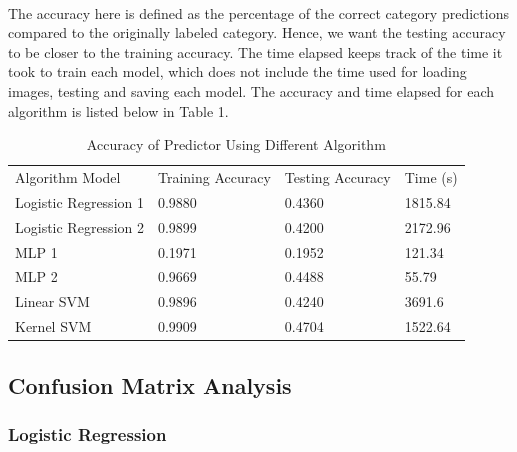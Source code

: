 \documentclass{article}
\begin{document}
\paragraph{}
The accuracy here is defined as the percentage of the correct category predictions compared to the originally labeled category. Hence, we want the testing accuracy to be closer to the training accuracy. The time elapsed keeps track of the time it took to train each model, which does not include the time used for loading images, testing and saving each model. The accuracy and time elapsed for each algorithm is listed below in Table 1.
\begin{table}[t]
\centering
\caption{Accuracy of Predictor Using Different Algorithm}
\label{my-label}
\begin{tabular}{llll}
\toprule
Algorithm Model & Training Accuracy & Testing Accuracy  &  Time (s) \\
Logistic Regression 1 & 0.9880 & 0.4360 &  1815.84  \\
Logistic Regression 2 & 0.9899 &  0.4200 & 2172.96  \\
MLP 1 & 0.1971 & 0.1952 & 121.34  \\ 
MLP 2 &  0.9669 & 0.4488 & 55.79  \\
Linear SVM & 0.9896 & 0.4240 & 3691.6 \\
Kernel SVM & 0.9909 & 0.4704 &  1522.64 \\
\bottomrule
\end{tabular}
\end{table}
\subsection{Confusion Matrix Analysis}  

\subsubsection{Logistic Regression}
\end{document}
